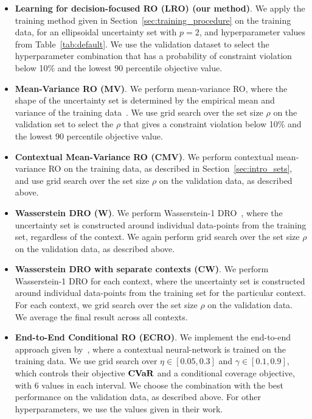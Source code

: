 \documentclass[11pt]{article}
\begin{document}
\begin{itemize}
\item {\bf Learning for decision-focused \gls{RO} (LRO) (our method)}. We apply the training method given in Section~\ref{sec:training_procedure} on the training data, for an ellipsoidal uncertainty set with $p=2$, and hyperparameter values from Table~\ref{tab:default}. We use the validation dataset to select the hyperparameter combination that has a probability of constraint violation below 10\% and the lowest 90 percentile objective value.
\item {\bf Mean-Variance \gls{RO} (MV)}. We perform mean-variance \gls{RO}, where the shape of the uncertainty set is determined by the empirical mean and variance of the training data~\citep{ben-tal_robust_2000}. We use grid search over the set size $\rho$ on the validation set to select the $\rho$ that gives a constraint violation below 10\% and the lowest 90 percentile objective value.
\item{\bf Contextual Mean-Variance \gls{RO} (CMV)}. We perform contextual mean-variance \gls{RO} on the training data, as described in Section~\ref{sec:intro_sets}, and use grid search over the set size $\rho$ on the validation data, as described above.
\item {\bf Wasserstein \gls{DRO} (W)}. We perform Wasserstein-1 \gls{DRO}~\citep{mohajerin_esfahani_data-driven_2018}, where the uncertainty set is constructed around individual data-points from the training set, regardless of the context. We again perform grid search over the set size $\rho$ on the validation data, as described above.
\item {\bf Wasserstein \gls{DRO} with separate contexts (CW)}. We perform Wasserstein-1 \gls{DRO} for each context, where the uncertainty set is constructed around individual data-points from the training set for the particular context. For each context, we grid search over the set size $\rho$ on the validation data. We average the final result across all contexts. 
\item {\bf End-to-End Conditional \gls{RO} (ECRO)}. We implement the end-to-end approach given by~\cite{cond-cov}, where a contextual neural-network is trained on the training data. We use grid search over $\eta \in [0.05,0.3]$ and $\gamma \in [0.1,0.9]$, which controls their objective $\mathop{\bf CVaR}$ and a conditional coverage objective, with 6 values in each interval. We choose the combination with the best performance on the validation data, as described above. For other hyperparameters, we use the values given in their work. 

\end{itemize}
\end{document}

